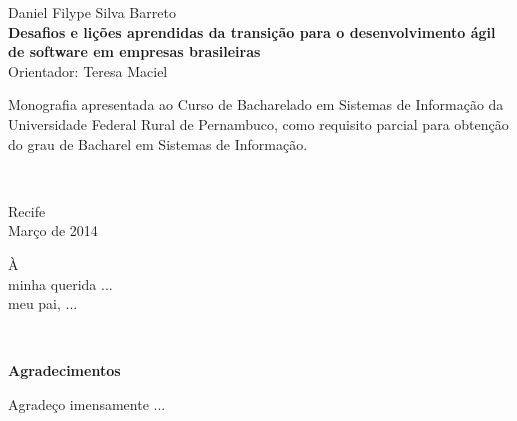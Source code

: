 %
\hyphenation{}

\vspace*{0.0cm}
{\center
{\Large Daniel Filype Silva Barreto}\\[2.4cm]
{\huge \bf Desafios e lições aprendidas da transição para o desenvolvimento ágil de software em empresas brasileiras}\\[2.0cm]
{\Large Orientador: Teresa Maciel}}\\[2.0cm]

{\raggedleft
\begin{minipage}[t]{8.3cm}
\setlength{\baselineskip}{0.25in}
Monografia apresentada ao Curso de Bacharelado em Sistemas de Informação da Universidade Federal Rural de Pernambuco, como requisito parcial para obtenção do grau de Bacharel em Sistemas de Informação.
\end{minipage}\\[2cm]}
\vspace{3cm}
{\center Recife \\[3mm]
Março de 2014 \\}

\newpage
\vspace*{18cm}
{\raggedleft
\begin{minipage}[t]{6.0cm}
\setlength{\baselineskip}{0.25in}
À\\
minha querida ...\\
meu pai, ...\\
\end{minipage}\\[2cm]}



\newpage
\begin{center}
{\Large \bf Agradecimentos}
\end{center}
\vspace*{-0.06in}

Agradeço imensamente ...


